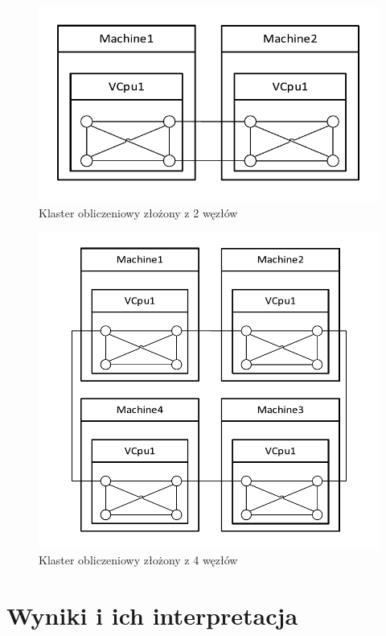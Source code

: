\documentclass[12pt, twoside, openany, abstract=on]{report}
\theoremstyle{definition}
\begin{document}
\begin{figure}[H]
    \centering
    \includegraphics[scale=1]{klasterBbobNoGPU2Nodes.pdf} 
 \caption{Klaster obliczeniowy złożony z 2 węzłów}
\end{figure}

\begin{figure}[H]
    \centering
    \includegraphics[scale=1]{klasterBbobNoGPU4Nodes.pdf} 
 \caption{Klaster obliczeniowy złożony z 4 węzłów}
\end{figure}

\section{Wyniki i ich interpretacja}
\end{document}
